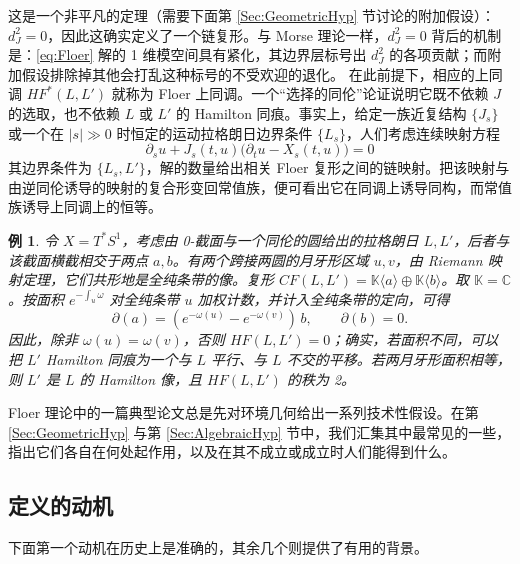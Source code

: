 \documentclass[11pt,a4paper]{article}
\numberwithin{equation}{section}
\newtheorem{Example}[thm]{例}
\newcommand{\bC}{\mathbb{C}}
\newcommand{\bK}{\mathbb{K}}
\begin{document}
这是一个非平凡的定理（需要下面第 \ref{Sec:GeometricHyp} 节讨论的附加假设）：$d_J^2 = 0$，因此这确实定义了一个链复形。与 Morse 理论一样，$d_J^2=0$ 背后的机制是：\eqref{eq:Floer} 解的 1 维模空间具有紧化，其边界层标号出 $d_J^2$ 的各项贡献；而附加假设排除掉其他会打乱这种标号的不受欢迎的退化。
在此前提下，相应的上同调 $HF^*(L,L')$ 就称为 Floer 上同调。一个“选择的同伦”论证说明它既不依赖 $J$ 的选取，也不依赖 $L$ 或 $L'$ 的 Hamilton 同痕。事实上，给定一族近复结构 $\{J_s\}$ 或一个在 $|s| \gg 0$ 时恒定的运动拉格朗日边界条件 $\{L_s\}$，人们考虑连续映射方程
\begin{equation} \label{Eqn:Continuation}
 \partial_s u + J_{s}(t,u) \big(\partial_tu - X_{s}(t,u)\big) = 0
\end{equation}  
其边界条件为 $\{L_s, L'\}$，解的数量给出相关 Floer 复形之间的链映射。把该映射与由逆同伦诱导的映射的复合形变回常值族，便可看出它在同调上诱导同构，而常值族诱导上同调上的恒等。

\begin{Example}
令 $X=T^*S^1$，考虑由 0-截面与一个同伦的圆给出的拉格朗日 $L, L'$，后者与该截面横截相交于两点 $a,b$。有两个跨接两圆的月牙形区域 $u,v$，由 Riemann 映射定理，它们共形地是全纯条带的像。复形 $CF(L, L') = \bK\langle a\rangle \oplus \bK\langle b\rangle$。取 $\bK = \bC$。按面积 $e^{-\int_u \omega}$ 对全纯条带 $u$ 加权计数，并计入全纯条带的定向，可得
\[
\partial(a) = (e^{-\omega(u)} - e^{-\omega(v)}) \, b, \qquad \partial(b) = 0.
\]
因此，除非 $\omega(u) = \omega(v)$，否则 $HF(L,L') =0$；确实，若面积不同，可以把 $L'$ Hamilton 同痕为一个与 $L$ 平行、与 $L$ 不交的平移。若两月牙形面积相等，则 $L'$ 是 $L$ 的 Hamilton 像，且 $HF(L,L')$ 的秩为 2。
\end{Example}

Floer 理论中的一篇典型论文总是先对环境几何给出一系列技术性假设。在第 \ref{Sec:GeometricHyp} 与第 \ref{Sec:AlgebraicHyp} 节中，我们汇集其中最常见的一些，指出它们各自在何处起作用，以及在其不成立或成立时人们能得到什么。

\subsection{定义的动机} 下面第一个动机在历史上是准确的，其余几个则提供了有用的背景。
\end{document}
